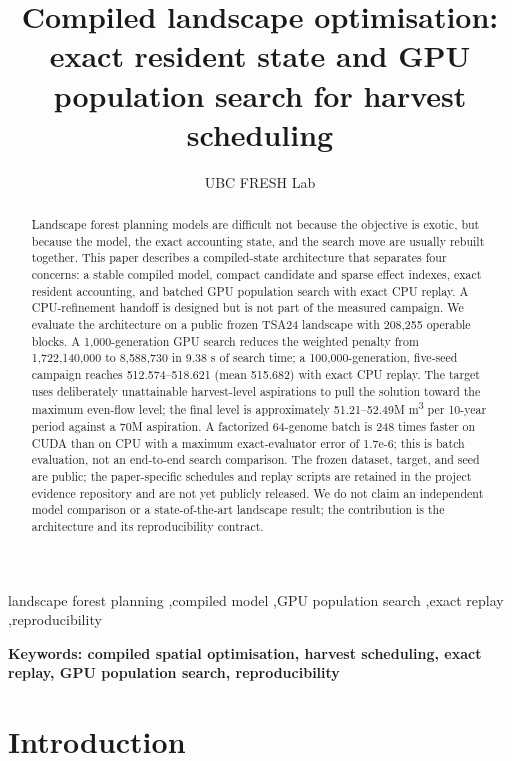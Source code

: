 \documentclass[preprint,11pt]{elsarticle}
\begin{document}
\begin{frontmatter}
\title{Compiled landscape optimisation: exact resident state and GPU population search for harvest scheduling}
\author[ubc]{UBC FRESH Lab}
\begin{abstract}
Landscape forest planning models are difficult not because the objective is exotic, but
because the model, the exact accounting state, and the search move are usually rebuilt together. This
paper describes a compiled-state architecture that separates four concerns: a stable compiled model,
compact candidate and sparse effect indexes, exact resident accounting, and batched GPU population
search with exact CPU replay. A CPU-refinement handoff is designed but is not part of the measured
campaign. We evaluate the architecture on a public frozen TSA24
landscape with 208,255 operable blocks. A 1,000-generation GPU search reduces the weighted penalty
from 1,722,140,000 to 8,588,730 in 9.38 s of search time; a 100,000-generation,
five-seed campaign reaches 512.574–518.621 (mean 515.682) with exact CPU replay. The target uses
deliberately unattainable harvest-level aspirations to pull the solution toward the maximum even-flow
level; the final level is approximately 51.21–52.49M m\textsuperscript{3} per 10-year period against a 70M aspiration.
A factorized 64-genome batch is 248 times faster on CUDA than on CPU with a maximum exact-evaluator
error of 1.7e-6; this is batch evaluation, not an end-to-end search comparison.
The frozen dataset, target, and seed are public; the paper-specific schedules and replay scripts are retained in the project evidence repository and are not yet publicly released. We do not claim an independent model
comparison or a state-of-the-art landscape result; the contribution is the architecture and its
reproducibility contract.
\end{abstract}
\begin{keyword}
landscape forest planning \sep compiled model \sep GPU population search \sep exact replay \sep reproducibility
\end{keyword}
\end{frontmatter}


\noindent\textbf{Keywords: compiled spatial optimisation, harvest scheduling, exact replay, GPU population search, reproducibility}

\section{Introduction}\label{introduction}
\end{document}

